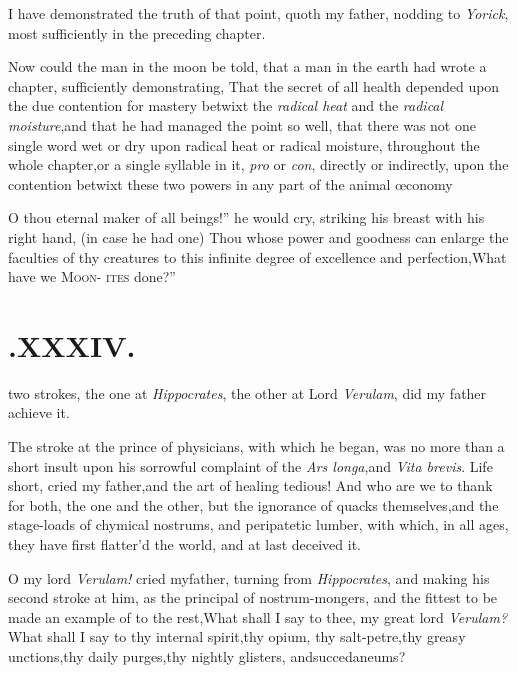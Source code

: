 \documentclass{article}
\begin{document}
I have demonstrated the truth of that point, quoth my father,
nodding to \textit{Yorick}, most sufficiently in the preceding
chapter.

Now could the man in the moon be told, that a man in the earth
had wrote a chapter, sufficiently demonstrating, That the secret of
all health depended upon the due contention for mastery betwixt the
\textit{radical heat} and the \textit{radical moisture},\tsk and that
he had managed the point so well, that there was not one single
word wet or dry upon radical heat or radical moisture, throughout
the whole chapter,\tsk or a single syllable in it, \textit{pro} or
\textit{con}, directly or indirectly, upon the contention betwixt
these two powers in any part of the animal
œconomy\tsh

\indent\lqq O thou eternal maker of all
beings!”\break
\tsk he would cry, striking his breast with
his right hand, (in case he had one)\tsk{}
\lqq Thou whose power and goodness can\break
\lqq enlarge the faculties of thy creatures to\break
\lqq this infinite degree of excellence and\break
\lqq perfection,\tsk What have we \textsc{Moon}-\break
\lqq \textsc{ites} done?”

\section{.\enspace  XXXIV.}

 two strokes, the one at\break
\textit{Hippocrates}, the other at Lord\break
\textit{Verulam}, did my father achieve it.

The stroke at the prince of physicians, with which he began, was
no more than a short insult upon his sorrowful complaint of the
\textit{Ars longa},\tsk and \textit{Vita brevis}.\break
\tsh Life short, cried my father,\tsk and the art of healing tedious! And
who are we to thank for both, the one and the other, but the
ignorance of quacks themselves,\tsk and the stage-loads of
chymical nostrums, and peripatetic lumber, with which, in all
ages, they have first flatter’d the world, and at last
deceived it.

\tsh  O my lord \textit{Verulam!} cried my\break father,
turning from \textit{Hippocrates}, and\break
making his second stroke at him, as the principal of nostrum-mongers, and the
fittest to be made an example of to the rest,\tsh What shall I say to thee, my great
lord \textit{Verulam?} What shall I say to thy internal spirit,\tsk thy opium,\tsk
thy salt-petre,\tsh thy greasy unctions,\tsk thy daily purges,\tsk thy nightly
glisters, and\break succedaneums?
\end{document}
